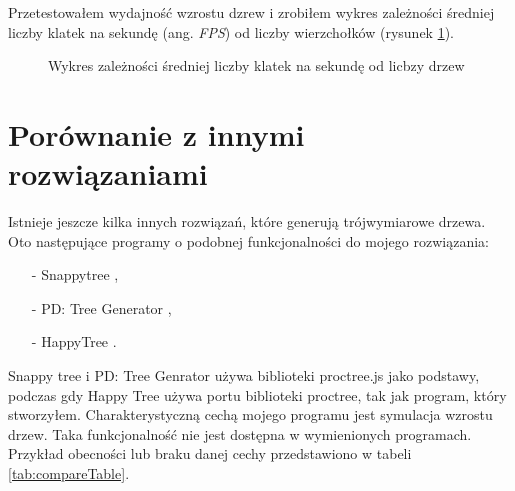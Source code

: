 \documentclass[a4paper,twoside,12pt]{report}
\begin{document}
Przetestowałem wydajność wzrostu dzrew i zrobiłem wykres 
zależności średniej liczby klatek na sekundę (ang. \textit{FPS}) 
od liczby wierzchołków (rysunek \ref{fig:chart}).

\begin{figure}[H]
	\begin{center}
	\end{center}
	\caption{Wykres zależności średniej liczby klatek na sekundę od licbzy drzew}
	\label{fig:chart}
\end{figure}

\section{Porównanie z innymi rozwiązaniami}

Istnieje jeszcze kilka innych rozwiązań, które generują 
trójwymiarowe drzewa. Oto następujące programy o podobnej 
funkcjonalności do mojego rozwiązania:
\begin{itemize}
	\item[-] Snappytree \cite{snappyTree},
	\item[-] PD: Tree Generator \cite{PDTree},
	\item[-] HappyTree \cite{proctree}. 
\end{itemize}
Snappy tree i PD: Tree Genrator używa biblioteki proctree.js 
jako podstawy, podczas gdy Happy Tree używa portu biblioteki proctree, 
tak jak program, który stworzyłem.
Charakterystyczną cechą mojego programu jest symulacja wzrostu drzew. 
Taka funkcjonalność nie jest dostępna w wymienionych programach.
Przykład obecności lub braku danej cechy przedstawiono w tabeli \ref{tab:compareTable}.
\end{document}
